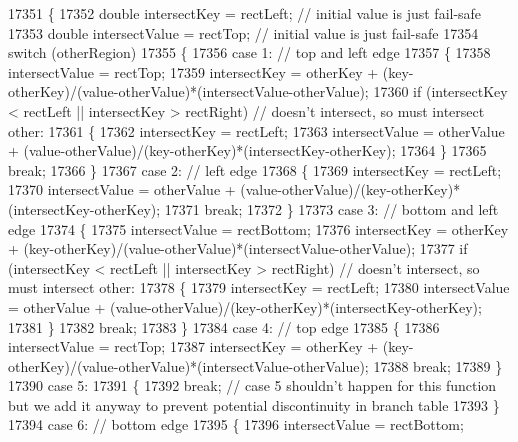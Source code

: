 \begin{DoxyCode}
17351 \{
17352   \textcolor{keywordtype}{double} intersectKey = rectLeft; \textcolor{comment}{// initial value is just fail-safe}
17353   \textcolor{keywordtype}{double} intersectValue = rectTop; \textcolor{comment}{// initial value is just fail-safe}
17354   \textcolor{keywordflow}{switch} (otherRegion)
17355   \{
17356     \textcolor{keywordflow}{case} 1: \textcolor{comment}{// top and left edge}
17357     \{
17358       intersectValue = rectTop;
17359       intersectKey = otherKey + (key-otherKey)/(value-otherValue)*(intersectValue-otherValue);
17360       \textcolor{keywordflow}{if} (intersectKey < rectLeft || intersectKey > rectRight) \textcolor{comment}{// doesn't intersect, so must intersect
       other:}
17361       \{
17362         intersectKey = rectLeft;
17363         intersectValue = otherValue + (value-otherValue)/(key-otherKey)*(intersectKey-otherKey);
17364       \}
17365       \textcolor{keywordflow}{break};
17366     \}
17367     \textcolor{keywordflow}{case} 2: \textcolor{comment}{// left edge}
17368     \{
17369       intersectKey = rectLeft;
17370       intersectValue = otherValue + (value-otherValue)/(key-otherKey)*(intersectKey-otherKey);
17371       \textcolor{keywordflow}{break};
17372     \}
17373     \textcolor{keywordflow}{case} 3: \textcolor{comment}{// bottom and left edge}
17374     \{
17375       intersectValue = rectBottom;
17376       intersectKey = otherKey + (key-otherKey)/(value-otherValue)*(intersectValue-otherValue);
17377       \textcolor{keywordflow}{if} (intersectKey < rectLeft || intersectKey > rectRight) \textcolor{comment}{// doesn't intersect, so must intersect
       other:}
17378       \{
17379         intersectKey = rectLeft;
17380         intersectValue = otherValue + (value-otherValue)/(key-otherKey)*(intersectKey-otherKey);
17381       \}
17382       \textcolor{keywordflow}{break};
17383     \}
17384     \textcolor{keywordflow}{case} 4: \textcolor{comment}{// top edge}
17385     \{
17386       intersectValue = rectTop;
17387       intersectKey = otherKey + (key-otherKey)/(value-otherValue)*(intersectValue-otherValue);
17388       \textcolor{keywordflow}{break};
17389     \}
17390     \textcolor{keywordflow}{case} 5:
17391     \{
17392       \textcolor{keywordflow}{break}; \textcolor{comment}{// case 5 shouldn't happen for this function but we add it anyway to prevent potential
       discontinuity in branch table}
17393     \}
17394     \textcolor{keywordflow}{case} 6: \textcolor{comment}{// bottom edge}
17395     \{
17396       intersectValue = rectBottom;

\end{DoxyCode}
